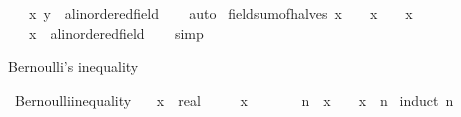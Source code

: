\begin{isabellebody}
\ \ \ x\ y\ {\isacharcolon}{\kern0pt}{\isacharcolon}{\kern0pt}\ {\isachardoublequoteopen}{\isacharprime}{\kern0pt}a{\isacharcolon}{\kern0pt}{\isacharcolon}{\kern0pt}linordered{\isacharunderscore}{\kern0pt}field{\isachardoublequoteclose}\isanewline
%
\isadelimproof
\ \ %
\endisadelimproof
%
\isatagproof
{}\isamarkupfalse%
\ auto%
\endisatagproof
{\isafoldproof}%
%
\isadelimproof
\isanewline
%
\endisadelimproof
\isanewline
{}\isamarkupfalse%
\ field{\isacharunderscore}{\kern0pt}sum{\isacharunderscore}{\kern0pt}of{\isacharunderscore}{\kern0pt}halves{\isacharcolon}{\kern0pt}\ {\isachardoublequoteopen}x\ {\isacharslash}{\kern0pt}\ {}\ {\isacharplus}{\kern0pt}\ x\ {\isacharslash}{\kern0pt}\ {}\ {\isacharequal}{\kern0pt}\ x{\isachardoublequoteclose}\isanewline
\ \ \ x\ {\isacharcolon}{\kern0pt}{\isacharcolon}{\kern0pt}\ {\isachardoublequoteopen}{\isacharprime}{\kern0pt}a{\isacharcolon}{\kern0pt}{\isacharcolon}{\kern0pt}linordered{\isacharunderscore}{\kern0pt}field{\isachardoublequoteclose}\isanewline
%
\isadelimproof
\ \ %
\endisadelimproof
%
\isatagproof
{}\isamarkupfalse%
\ simp%
\endisatagproof
{\isafoldproof}%
%
\isadelimproof
%
\endisadelimproof
%
\isadelimdocument
%
\endisadelimdocument
%
\isatagdocument
%
\isamarkuptrue%
%
\endisatagdocument
{\isafolddocument}%
%
\isadelimdocument
%
\endisadelimdocument
%
\begin{isamarkuptext}%
Bernoulli's inequality%
\end{isamarkuptext}\isamarkuptrue%
\isamarkupfalse%
\ Bernoulli{\isacharunderscore}{\kern0pt}inequality{\isacharcolon}{\kern0pt}\isanewline
\ \ \ x\ {\isacharcolon}{\kern0pt}{\isacharcolon}{\kern0pt}\ real\isanewline
\ \ \ {\isachardoublequoteopen}{\isacharminus}{\kern0pt}{}\ {\isasymle}\ x{\isachardoublequoteclose}\isanewline
\ \ \ \ \ {\isachardoublequoteopen}{}\ {\isacharplus}{\kern0pt}\ n\ {\isacharasterisk}{\kern0pt}\ x\ {\isasymle}\ {\isacharparenleft}{\kern0pt}{}\ {\isacharplus}{\kern0pt}\ x{\isacharparenright}{\kern0pt}\ {\isacharcircum}{\kern0pt}\ n{\isachardoublequoteclose}\isanewline
%
\isadelimproof
%
\endisadelimproof
%
\isatagproof
{}\isamarkupfalse%
\ {\isacharparenleft}{\kern0pt}induct\ n{\isacharparenright}{\kern0pt}\isanewline
\ \ \isamarkupfalse%
\ {}\isanewline
\ \ \isamarkupfalse%

\end{isabellebody}
